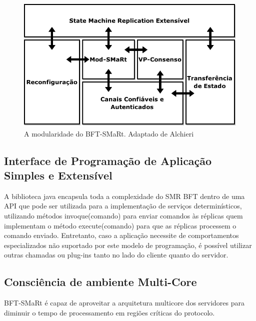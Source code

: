 		\begin{figure}[htb]
			\begin{center}
				
				\includegraphics[clip,width=13.0cm]{images/image4.png}
				\caption{A modularidade do BFT-SMaRt. Adaptado de Alchieri~\cite{bessani3}}
				\label{fig:vis_sis}
			\end{center}
		\end{figure}
		
		\subsection{Interface de Programação de Aplicação Simples e Extensível}
		A biblioteca java encapsula toda a complexidade do SMR BFT dentro de uma API que pode ser utilizada para a implementação de serviços determinísticos, utilizando métodos invoque(comando) para enviar comandos às réplicas quem implementam o método execute(comando) para que as réplicas processem o comando enviado. Entretanto, caso a aplicação necessite de comportamentos especializados não suportado por este modelo de programação, é possível utilizar outras chamadas ou plug-ins tanto no lado do cliente quanto do servidor.\\
		
		
		\subsection{Consciência de ambiente Multi-Core}
		BFT-SMaRt é capaz de aproveitar a arquitetura multicore dos servidores para diminuir o tempo de processamento em regiões críticas do protocolo.\\
		
